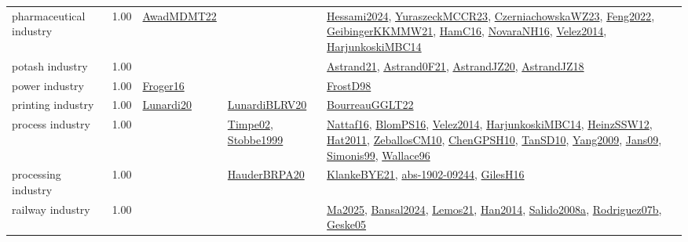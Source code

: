 {\begin{longtable}{p{3cm}r>{\raggedright\arraybackslash}p{6cm}>{\raggedright\arraybackslash}p{6cm}>{\raggedright\arraybackslash}p{8cm}}
\index{pharmaceutical industry}\index{Industries!pharmaceutical industry}pharmaceutical industry &  1.00 & \hyperref[detail:AwadMDMT22]{AwadMDMT22} &  & \hyperref[detail:Hessami2024]{Hessami2024}, \hyperref[detail:YuraszeckMCCR23]{YuraszeckMCCR23}, \hyperref[detail:CzerniachowskaWZ23]{CzerniachowskaWZ23}, \hyperref[detail:Feng2022]{Feng2022}, \hyperref[detail:GeibingerKKMMW21]{GeibingerKKMMW21}, \hyperref[detail:HamC16]{HamC16}, \hyperref[detail:NovaraNH16]{NovaraNH16}, \hyperref[detail:Velez2014]{Velez2014}, \hyperref[detail:HarjunkoskiMBC14]{HarjunkoskiMBC14}\\
\index{potash industry}\index{Industries!potash industry}potash industry &  1.00 &  &  & \hyperref[detail:Astrand21]{Astrand21}, \hyperref[detail:Astrand0F21]{Astrand0F21}, \hyperref[detail:AstrandJZ20]{AstrandJZ20}, \hyperref[detail:AstrandJZ18]{AstrandJZ18}\\
\index{power industry}\index{Industries!power industry}power industry &  1.00 & \hyperref[detail:Froger16]{Froger16} &  & \hyperref[detail:FrostD98]{FrostD98}\\
\index{printing industry}\index{Industries!printing industry}printing industry &  1.00 & \hyperref[detail:Lunardi20]{Lunardi20} & \hyperref[detail:LunardiBLRV20]{LunardiBLRV20} & \hyperref[detail:BourreauGGLT22]{BourreauGGLT22}\\
\index{process industry}\index{Industries!process industry}process industry &  1.00 &  & \hyperref[detail:Timpe02]{Timpe02}, \hyperref[detail:Stobbe1999]{Stobbe1999} & \hyperref[detail:Nattaf16]{Nattaf16}, \hyperref[detail:BlomPS16]{BlomPS16}, \hyperref[detail:Velez2014]{Velez2014}, \hyperref[detail:HarjunkoskiMBC14]{HarjunkoskiMBC14}, \hyperref[detail:HeinzSSW12]{HeinzSSW12}, \hyperref[detail:Hat2011]{Hat2011}, \hyperref[detail:ZeballosCM10]{ZeballosCM10}, \hyperref[detail:ChenGPSH10]{ChenGPSH10}, \hyperref[detail:TanSD10]{TanSD10}, \hyperref[detail:Yang2009]{Yang2009}, \hyperref[detail:Jans09]{Jans09}, \hyperref[detail:Simonis99]{Simonis99}, \hyperref[detail:Wallace96]{Wallace96}\\
\index{processing industry}\index{Industries!processing industry}processing industry &  1.00 &  & \hyperref[detail:HauderBRPA20]{HauderBRPA20} & \hyperref[detail:KlankeBYE21]{KlankeBYE21}, \hyperref[detail:abs-1902-09244]{abs-1902-09244}, \hyperref[detail:GilesH16]{GilesH16}\\
\index{railway industry}\index{Industries!railway industry}railway industry &  1.00 &  &  & \hyperref[detail:Ma2025]{Ma2025}, \hyperref[detail:Bansal2024]{Bansal2024}, \hyperref[detail:Lemos21]{Lemos21}, \hyperref[detail:Han2014]{Han2014}, \hyperref[detail:Salido2008a]{Salido2008a}, \hyperref[detail:Rodriguez07b]{Rodriguez07b}, \hyperref[detail:Geske05]{Geske05}\\

\end{longtable}}
